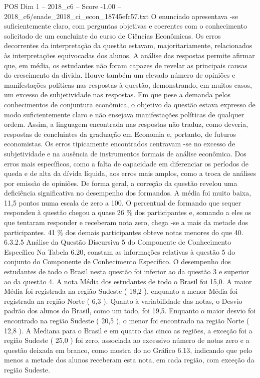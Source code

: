 \begin{textsample}{POS Dim 1 – 2018\_c6 – Score -1.00 – 2018\_c6/enade\_2018\_ci\_econ\_18745efc57.txt}
O enunciado apresentava -se suficientemente claro, com perguntas objetivas e coerentes com o conhecimento solicitado de um concluinte do curso de Ciências Econômicas.
Os erros decorrentes da interpretação da questão estavam, majoritariamente, relacionados às interpretações equivocadas dos alunos.
A análise das respostas permite afirmar que, em média, os estudantes não foram capazes de revelar as principais causas do crescimento da dívida.
Houve também um elevado número de opiniões e manifestações políticas nas respostas à questão, demonstrando, em muitos casos, um excesso de subjetividade nas respostas.
Em que pese a demanda pelos conhecimentos de conjuntura econômica, o objetivo da questão estava expresso de modo suficientemente claro e não ensejava manifestações políticas de qualquer ordem.
Assim, a linguagem encontrada nas respostas não traduz, como deveria, respostas de concluintes da graduação em Economia e, portanto, de futuros economistas.
Os erros tipicamente encontrados centravam -se no excesso de subjetividade e na ausência de instrumentos formais de análise econômica.
Dos erros mais específicos, como a falta de capacidade em diferenciar os períodos de queda e de alta da dívida líquida, aos erros mais amplos, como a troca de análises por emissão de opiniões.
De forma geral, a correção da questão revelou uma deficiência significativa no desempenho dos formandos.
A média foi muito baixa, 11,5 pontos numa escala de zero a 100.
O percentual de formando que sequer respondeu à questão chegou a quase 26 \% dos participantes e, somando a eles os que tentaram responder e receberam nota zero, chega -se a mais da metade dos participantes. 41 \% dos demais participantes obteve notas menores do que 40. 6.3.2.5 Análise da Questão Discursiva 5 do Componente de Conhecimento Específico Na Tabela 6.20, constam as informações relativas à questão 5 do conjunto do Componente de Conhecimento Específico.
O desempenho dos estudantes de todo o Brasil nesta questão foi inferior ao da questão 3 e superior ao da questão 4.
A nota Média dos estudantes de todo o Brasil foi 15,0.
A maior Média foi registrada na região Sudeste ( 18,2 ), enquanto a menor Média foi registrada na região Norte ( 6,3 ).
Quanto à variabilidade das notas, o Desvio padrão dos alunos do Brasil, como um todo, foi 19,5.
Enquanto o maior desvio foi encontrado na região Sudeste ( 20,5 ), o menor foi encontrado na região Norte ( 12,8 ).
A Mediana para o Brasil e em quatro das cinco as regiões, a exceção foi a região Sudeste ( 25,0 ) foi zero, associada ao excessivo número de notas zero e a questão deixada em branco, como mostra do no Gráfico 6.13, indicando que pelo menos a metade dos alunos receberam esta nota, em cada região, com exceção da região Sudeste.

\end{textsample}
